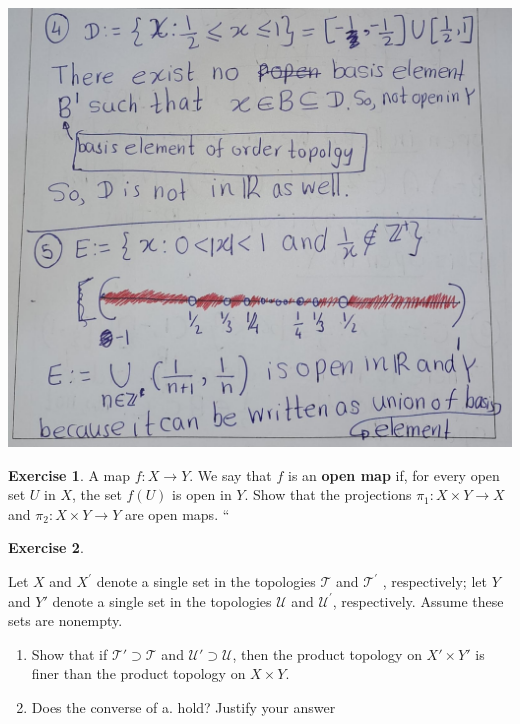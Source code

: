 \documentclass[
]{book}
\providecommand{\tightlist}{%
  \setlength{\itemsep}{0pt}\setlength{\parskip}{0pt}}
\theoremstyle{definition}
\theoremstyle{definition}
\theoremstyle{definition}
\newtheorem{exercise}{Exercise}[chapter]
\theoremstyle{definition}
\theoremstyle{remark}
\begin{document}
\includegraphics{figures/Exercises/Ex 2.16/ex 3-2.jpg}

\begin{exercise}
\protect\hypertarget{exr:unnamed-chunk-97}{}\label{exr:unnamed-chunk-97}A map \(f : X \to Y\). We say that \(f\) is an \textbf{open map} if, for every open set \(U\) in \(X\), the set \(f(U)\) is open in \(Y\). Show that the projections \(\pi_1 : X \times Y \to X\) and \(\pi_2 : X \times Y \to Y\) are open maps.
``
\end{exercise}

\begin{exercise}
\protect\hypertarget{exr:unnamed-chunk-98}{}\label{exr:unnamed-chunk-98}

Let \(X\) and \(X^\prime\) denote a single set in the topologies \(\mathcal{T}\) and \(\mathcal{T}^\prime\) , respectively; let \(Y\)
and \(Y'\) denote a single set in the topologies \(\mathcal{U}\) and \(\mathcal{U}^\prime\), respectively. Assume these sets are nonempty.

\begin{enumerate}
\def\labelenumi{(\alph{enumi})}
\tightlist
\item
  Show that if \(\mathcal{T}' \supset \mathcal{T}\) and \(\mathcal{U}'\supset \mathcal{U}\), then the product topology on \(X'\times Y'\) is
  finer than the product topology on \(X \times Y\).
\item
  Does the converse of a. hold? Justify your answer
\end{enumerate}

\end{exercise}
\end{document}
